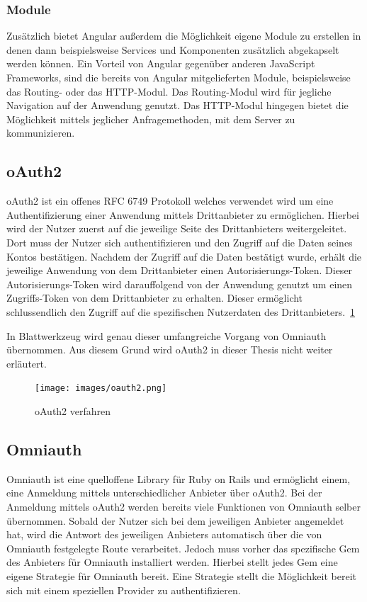 \documentclass[paper=a4,fontsize=12pt,parskip=half]{scrartcl}
\begin{document}
	\subsubsection{Module}
	\label{sec: ang-modul}
	Zusätzlich bietet Angular außerdem die Möglichkeit eigene Module zu erstellen in denen dann beispielsweise Services und Komponenten zusätzlich abgekapselt werden können. Ein Vorteil von Angular gegenüber anderen JavaScript Frameworks, sind die bereits von Angular mitgelieferten Module, beispielsweise das Routing- oder das HTTP-Modul. Das Routing-Modul wird für jegliche Navigation auf der Anwendung genutzt. Das \gls{HTTP}-Modul hingegen bietet die Möglichkeit mittels jeglicher Anfragemethoden, mit dem Server zu kommunizieren.

	\subsection{oAuth2}
	\label{sec: oauth2}
	\gls{oAuth2} ist ein offenes \gls{RFC} 6749 Protokoll welches verwendet wird um eine Authentifizierung einer Anwendung mittels Drittanbieter zu ermöglichen. Hierbei wird der Nutzer zuerst auf die jeweilige Seite des Drittanbieters weitergeleitet. Dort muss der Nutzer sich authentifizieren und den Zugriff auf die Daten seines Kontos bestätigen. Nachdem der Zugriff auf die Daten bestätigt wurde, erhält die jeweilige Anwendung von dem Drittanbieter einen Autorisierungs-Token. Dieser Autorisierungs-Token wird darauffolgend von der Anwendung genutzt um einen Zugriffs-Token von dem Drittanbieter zu erhalten. Dieser ermöglicht schlussendlich den Zugriff auf die spezifischen Nutzerdaten des Drittanbieters.~\ref{fig:oauth2}

	In Blattwerkzeug wird genau dieser umfangreiche Vorgang von Omniauth übernommen. Aus diesem Grund wird oAuth2 in dieser Thesis nicht weiter erläutert.

	\begin{figure}[h]
		\texttt{[image: images/oauth2.png]}
		\caption{oAuth2 verfahren}
		\label{fig:oauth2}
	\end{figure}

	\subsection{Omniauth}
	\label{sec:omniauth}
	Omniauth ist eine quelloffene Library für Ruby on Rails und ermöglicht einem, eine Anmeldung mittels unterschiedlicher Anbieter über \gls{oAuth2}. Bei der Anmeldung mittels oAuth2 werden bereits viele Funktionen von Omniauth selber übernommen. Sobald der Nutzer sich bei dem jeweiligen Anbieter angemeldet hat, wird die Antwort des jeweiligen Anbieters automatisch über die von Omniauth festgelegte Route verarbeitet. Jedoch muss vorher das spezifische Gem des Anbieters für Omniauth installiert werden. Hierbei stellt jedes Gem eine eigene Strategie für Omniauth bereit. Eine Strategie stellt die Möglichkeit bereit sich mit einem speziellen Provider zu authentifizieren.
\end{document}
